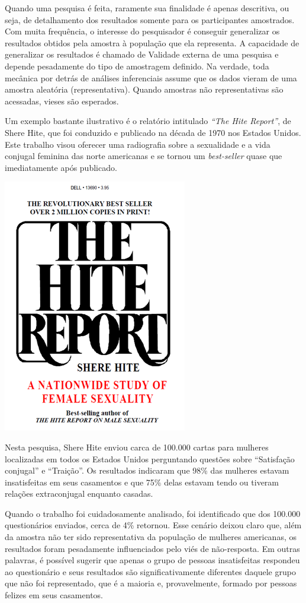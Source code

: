 \documentclass[
]{book}
\begin{document}
Quando uma pesquisa é feita, raramente sua finalidade é apenas descritiva, ou seja, de detalhamento dos resultados somente para os participantes amostrados. Com muita frequência, o interesse do pesquisador é conseguir generalizar os resultados obtidos pela amostra à população que ela representa. A capacidade de generalizar os resultados é chamado de Validade externa de uma pesquisa e depende pesadamente do tipo de amostragem definido. Na verdade, toda mecânica por detrás de análises inferenciais assume que os dados vieram de uma amostra aleatória (representativa). Quando amostras não representativas são acessadas, vieses são esperados.

Um exemplo bastante ilustrativo é o relatório intitulado \emph{``The Hite Report''}, de Shere Hite, que foi conduzido e publicado na década de 1970 nos Estados Unidos. Este trabalho visou oferecer uma radiografia sobre a sexualidade e a vida conjugal feminina das norte americanas e se tornou um \emph{best-seller} quase que imediatamente após publicado.

\includegraphics{./img/cap_importancia_amostragem.png}

Nesta pesquisa, Shere Hite enviou carca de 100.000 cartas para mulheres localizadas em todos os Estados Unidos perguntando questões sobre ``Satisfação conjugal'' e ``Traição''. Os resultados indicaram que 98\% das mulheres estavam insatisfeitas em seus casamentos e que 75\% delas estavam tendo ou tiveram relações extraconjugal enquanto casadas.

Quando o trabalho foi cuidadosamente analisado, foi identificado que dos 100.000 questionários enviados, cerca de 4\% retornou. Esse cenário deixou claro que, além da amostra não ter sido representativa da população de mulheres americanas, os resultados foram pesadamente influenciados pelo viés de não-resposta. Em outras palavras, é possível sugerir que apenas o grupo de pessoas insatisfeitas respondeu ao questionário e seus resultados são significativamente diferentes daquele grupo que não foi representado, que é a maioria e, provavelmente, formado por pessoas felizes em seus casamentos.
\end{document}
